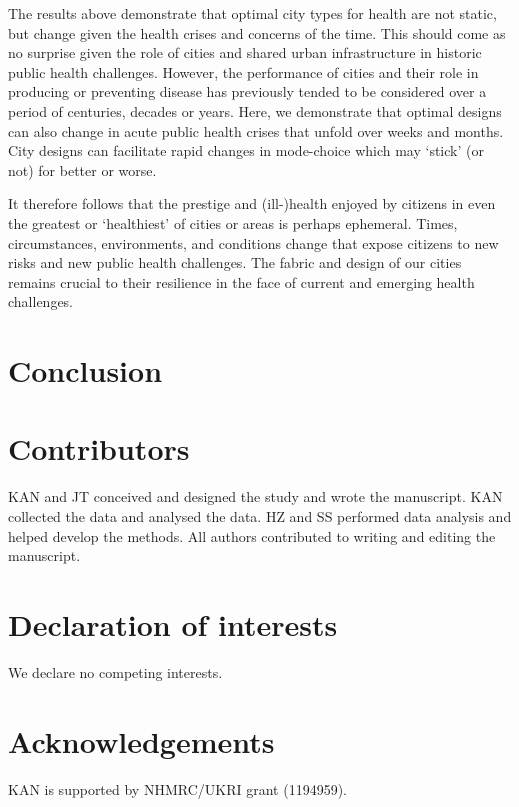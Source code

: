 \documentclass[preprint,12pt]{elsarticle}
\begin{document}
The results above demonstrate that optimal city types for health are not static, but change given the health crises and concerns of the time. This should come as no surprise given the role of cities and shared urban infrastructure in historic public health challenges. However, the performance of cities and their role in producing or preventing disease has previously tended to be considered over a period of centuries, decades or years. Here, we demonstrate that optimal designs can also change in acute public health crises that unfold over weeks and months. City designs can facilitate rapid changes in mode-choice which may `stick' (or not) for better or worse. 

It therefore follows that the prestige and (ill-)health enjoyed by citizens in even the greatest or `healthiest' of cities or areas is perhaps ephemeral. Times, circumstances, environments, and conditions change that expose citizens to new risks and new public health challenges. The fabric and design of our cities remains crucial to their resilience in the face of current and emerging health challenges.


\section*{Conclusion}


\section*{Contributors}\label{sec:credit}
KAN and JT conceived and designed the study and wrote the manuscript. KAN collected the data and analysed the data. HZ and SS performed data analysis and helped develop the methods. All authors contributed to writing and editing the manuscript.

\section*{Declaration of interests}\label{sec:dec}
We declare no competing interests.

\section*{Acknowledgements}\label{sec:ak}
KAN is supported by NHMRC/UKRI grant (1194959).
\end{document}

